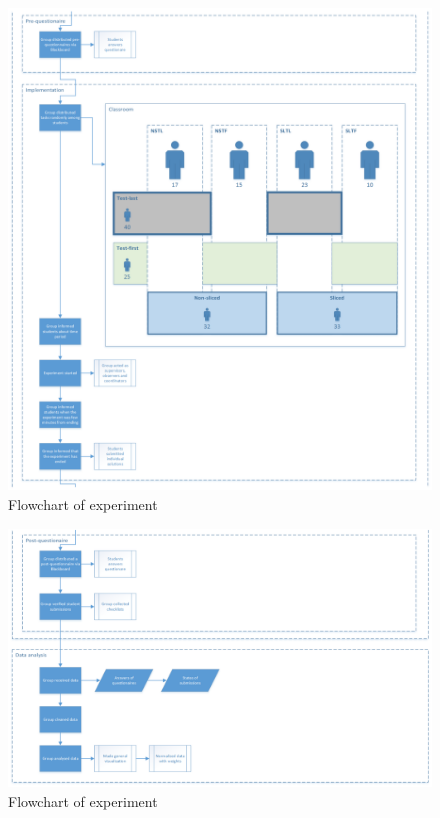 \documentclass{sig-alternate-05-2015}
\begin{document}
\begin{figure}[!ht]
	\centering
	\includegraphics[width=2.13\linewidth]{flow02}
	\caption{Flowchart of experiment}
	\label{fig:Flowchart}
\end{figure}
\clearpage

\begin{figure}[!ht]
	\centering
	\includegraphics[width=2.13\linewidth]{flow03}
	\caption{Flowchart of experiment}
	\label{fig:Flowchart}
\end{figure}
\end{document}
